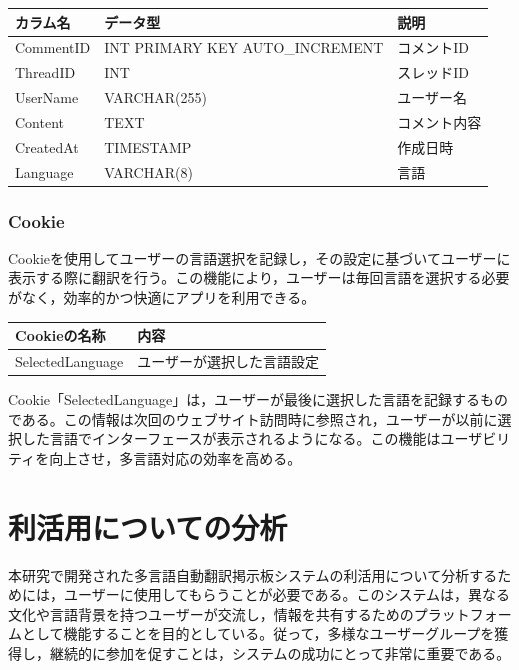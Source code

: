 \documentclass[b5paper,12pt]{jsreport}
\begin{document}
\begin{adjustbox}{width=\textwidth,center}
	\begin{tabular}{lll}
	\toprule
	\textbf{カラム名} & \textbf{データ型} & \textbf{説明} \\
	\midrule
	CommentID  & INT PRIMARY KEY AUTO\_INCREMENT & コメントID \\
	ThreadID   & INT & スレッドID \\
	UserName   & VARCHAR(255) & ユーザー名 \\
	Content    & TEXT & コメント内容 \\
	CreatedAt  & TIMESTAMP & 作成日時 \\
	Language   & VARCHAR(8) & 言語 \\
	\bottomrule
	\end{tabular}
\end{adjustbox}

\subsection*{Cookie}

Cookieを使用してユーザーの言語選択を記録し，その設定に基づいてユーザーに表示する際に翻訳を行う。この機能により，ユーザーは毎回言語を選択する必要がなく，効率的かつ快適にアプリを利用できる。

\begin{adjustbox}{width=\textwidth,center}
    \begin{tabular}{ll}
    \toprule
    \textbf{Cookieの名称} & \textbf{内容} \\
    \midrule
    SelectedLanguage & ユーザーが選択した言語設定 \\
    \bottomrule
    \end{tabular}
\end{adjustbox}

Cookie「SelectedLanguage」は，ユーザーが最後に選択した言語を記録するものである。この情報は次回のウェブサイト訪問時に参照され，ユーザーが以前に選択した言語でインターフェースが表示されるようになる。この機能はユーザビリティを向上させ，多言語対応の効率を高める。


\chapter{利活用についての分析}

本研究で開発された多言語自動翻訳掲示板システムの利活用について分析するためには，ユーザーに使用してもらうことが必要である。このシステムは，異なる文化や言語背景を持つユーザーが交流し，情報を共有するためのプラットフォームとして機能することを目的としている。従って，多様なユーザーグループを獲得し，継続的に参加を促すことは，システムの成功にとって非常に重要である。
\end{document}

